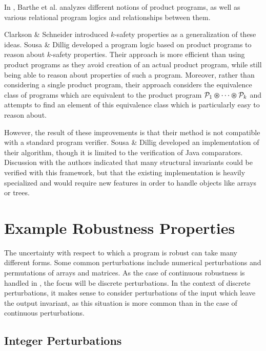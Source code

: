 \documentclass{llncs}
\begin{document}
    In \cite{bartheanalysis}, Barthe et al.
    analyzes different notions of product programs, as well as various relational program logics and relationships between them.
    \smallskip

    \space\space Clarkson \& Schneider
    \cite{clarkson08} introduced \(k\)-safety properties as a generalization of 
    these ideas. Sousa \& Dillig \cite{sousa16} developed a program logic based on product programs
    to reason about \(k\)-safety properties.  Their approach is more efficient than
    using product programs as they avoid creation of an actual product program, while
    still being able to reason about properties of such a program.  Moreover, rather than
    considering a single product program, their approach considers the equivalence
    class of programs which are equivalent to the product program
    \(\mathcal{P}_{1} \varoast \dotsb \varoast \mathcal{P}_{k}\) and attempts to
    find an element of this equivalence class which is particularly easy
    to reason about.

    However, the result of these improvements is that their method is not compatible
    with a standard program verifier. Sousa \& Dillig developed
    an implementation of their algorithm, though it is limited to the verification
    of Java comparators.
    Discussion with the authors indicated that many structural invariants could
    be verified with this framework, but that the existing implementation is
    heavily specialized and would require new features in order to handle objects like
    arrays or trees.

\section{Example Robustness Properties}

  The uncertainty with respect to which a program is robust can take many
  different forms.  Some common perturbations include numerical perturbations
  \cite{samanta14,chaudhuri10,chaudhuri11} and permutations of arrays and matrices.
  As the case of continuous robustness is handled in \cite{chaudhuri10,chaudhuri11},
  the focus will be discrete perturbations.  In the context of discrete perturbations, it makes sense to consider perturbations of the input which leave the output invariant, as this situation is more common than in the case of continuous perturbations.

  \subsection{Integer Perturbations}
\end{document}
